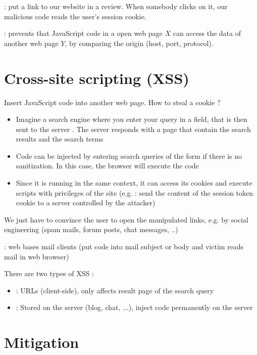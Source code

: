  : put a link to our website in a review. When somebody clicks on it, our malicious code reads the user's session cookie.

 : prevents that JavaScript code in a open web page $X$ can access the data of another web page $Y$, by comparing the origin (host, port, protocol).

\section{Cross-site scripting (XSS)}

Insert JavaScript code into another web page. How to steal a cookie ?

\begin{itemize}
    \item Imagine a search engine where you enter your query in a  field, that is then sent to the server . The server responds with a page that contain the search results and the search terms
    \item Code can be injected by entering search queries of the form  if there is no sanitization. In this case, the browser will execute the code
    \item Since it is running in the same context, it can access its cookies and execute scripts with privileges of the site (e.g. : send the content of the session token cookie to a server controlled by the attacker)
\end{itemize}

We just have to convince the user to open the manipulated links, e.g. by social engineering (spam mails, forum posts, chat messages, ..)

 : web bases mail clients (put code into mail subject or body and victim reads mail in web browser)

There are two types of XSS :
\begin{itemize}
    \item {} : URLs (client-side), only affects result page of the search query
    \item {} : Stored on the server (blog, chat, ...), inject code permanently on the server
\end{itemize}

\section{Mitigation}

